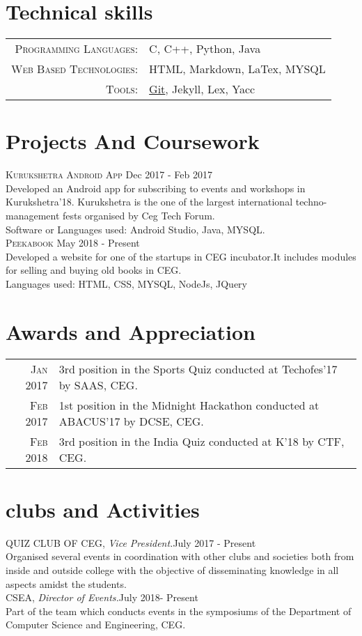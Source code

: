 \documentclass[a4paper,10pt]{article}
\begin{document}
\section{Technical skills}
\begin{tabular}{rl}
 \textsc{Programming Languages:}& C, C++, Python, Java\\
\textsc{Web Based Technologies:}& HTML, Markdown, LaTex, MYSQL\\
\textsc{Tools:}&  \href{https://github.com/kullsno2}{Git}, Jekyll, Lex, Yacc\\
\end{tabular}

\section{Projects And Coursework}
\textsc{Kurukshetra Android App} \hfill Dec 2017 - Feb 2017 \\
Developed an Android app for subscribing to events and workshops in Kurukshetra'18. Kurukshetra is the one of the largest international techno-management fests organised by Ceg Tech Forum.\\
Software or Languages used: Android Studio, Java, MYSQL. \\

\textsc{Peekabook} \hfill May 2018 - Present \\
 Developed a website for one of the startups in CEG incubator.It includes modules for selling and buying old books in CEG.\\
Languages used: HTML, CSS, MYSQL, NodeJs, JQuery
\section{Awards and Appreciation}
\begin{tabular}{rl}

\textsc{Jan} 2017 &3rd position in the Sports Quiz conducted at Techofes'17 by SAAS, CEG.  \\
 \textsc{Feb} 2017 &1st position in the Midnight Hackathon conducted at  ABACUS’17 by DCSE, CEG. \\
\textsc{Feb} 2018 & 3rd position in the India Quiz conducted at K'18 by CTF, CEG.
\end{tabular}

\section{clubs and Activities}
QUIZ CLUB OF CEG, \emph{Vice President.}\hfill July 2017 - Present\\
Organised several events in coordination with other clubs and societies both from inside and outside college with the objective of disseminating knowledge in all aspects amidst the students.\\

CSEA, \emph{Director of Events.}\hfill July 2018- Present\\
Part of the team which conducts events in the symposiums of the Department of Computer Science and Engineering, CEG.
\end{document}

